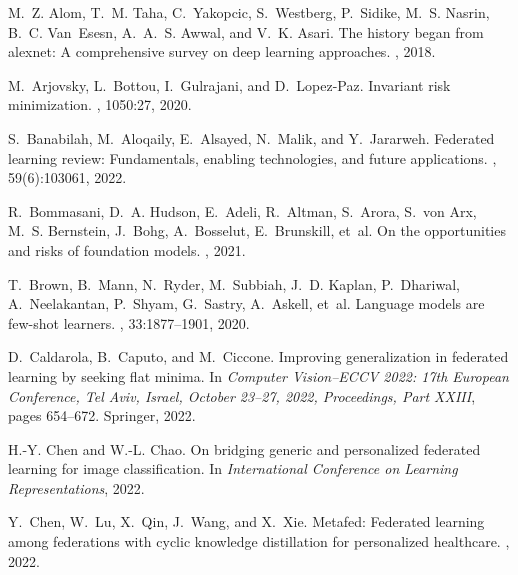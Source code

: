 \documentclass[11pt]{article}
\begin{document}
\begin{thebibliography}{10}

M.~Z. Alom, T.~M. Taha, C.~Yakopcic, S.~Westberg, P.~Sidike, M.~S. Nasrin,
  B.~C. Van~Esesn, A.~A.~S. Awwal, and V.~K. Asari.
\newblock The history began from alexnet: A comprehensive survey on deep
  learning approaches.
, 2018.

M.~Arjovsky, L.~Bottou, I.~Gulrajani, and D.~Lopez-Paz.
\newblock Invariant risk minimization.
, 1050:27, 2020.

S.~Banabilah, M.~Aloqaily, E.~Alsayed, N.~Malik, and Y.~Jararweh.
\newblock Federated learning review: Fundamentals, enabling technologies, and
  future applications.
, 59(6):103061, 2022.

R.~Bommasani, D.~A. Hudson, E.~Adeli, R.~Altman, S.~Arora, S.~von Arx, M.~S.
  Bernstein, J.~Bohg, A.~Bosselut, E.~Brunskill, et~al.
\newblock On the opportunities and risks of foundation models.
, 2021.

T.~Brown, B.~Mann, N.~Ryder, M.~Subbiah, J.~D. Kaplan, P.~Dhariwal,
  A.~Neelakantan, P.~Shyam, G.~Sastry, A.~Askell, et~al.
\newblock Language models are few-shot learners.
,
  33:1877--1901, 2020.

D.~Caldarola, B.~Caputo, and M.~Ciccone.
\newblock Improving generalization in federated learning by seeking flat
  minima.
\newblock In {\em Computer Vision--ECCV 2022: 17th European Conference, Tel
  Aviv, Israel, October 23--27, 2022, Proceedings, Part XXIII}, pages 654--672.
  Springer, 2022.

H.-Y. Chen and W.-L. Chao.
\newblock On bridging generic and personalized federated learning for image
  classification.
\newblock In {\em International Conference on Learning Representations}, 2022.

Y.~Chen, W.~Lu, X.~Qin, J.~Wang, and X.~Xie.
\newblock Metafed: Federated learning among federations with cyclic knowledge
  distillation for personalized healthcare.
, 2022.


\end{thebibliography}
\end{document}
